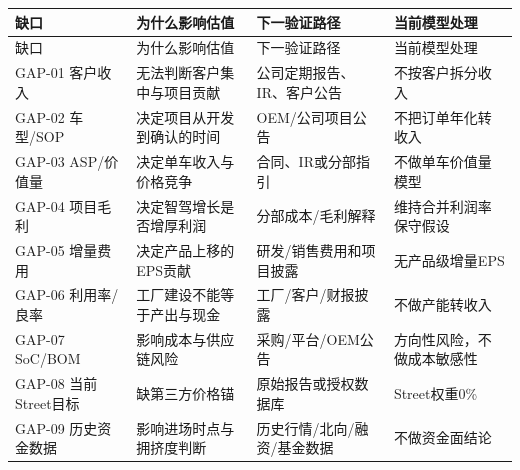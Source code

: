 \begin{longtable}{L{1.2cm}L{2.4cm}L{3.6cm}L{4.7cm}}
\toprule
缺口 & 为什么影响估值 & 下一验证路径 & 当前模型处理 \\
\midrule
\endfirsthead
\toprule
缺口 & 为什么影响估值 & 下一验证路径 & 当前模型处理 \\
\midrule
\endhead
GAP-01 客户收入 & 无法判断客户集中与项目贡献 & 公司定期报告、IR、客户公告 & 不按客户拆分收入 \\
GAP-02 车型/SOP & 决定项目从开发到确认的时间 & OEM/公司项目公告 & 不把订单年化转收入 \\
GAP-03 ASP/价值量 & 决定单车收入与价格竞争 & 合同、IR或分部指引 & 不做单车价值量模型 \\
GAP-04 项目毛利 & 决定智驾增长是否增厚利润 & 分部成本/毛利解释 & 维持合并利润率保守假设 \\
GAP-05 增量费用 & 决定产品上移的EPS贡献 & 研发/销售费用和项目披露 & 无产品级增量EPS \\
GAP-06 利用率/良率 & 工厂建设不能等于产出与现金 & 工厂/客户/财报披露 & 不做产能转收入 \\
GAP-07 SoC/BOM & 影响成本与供应链风险 & 采购/平台/OEM公告 & 方向性风险，不做成本敏感性 \\
GAP-08 当前Street目标 & 缺第三方价格锚 & 原始报告或授权数据库 & Street权重0\% \\
GAP-09 历史资金数据 & 影响进场时点与拥挤度判断 & 历史行情/北向/融资/基金数据 & 不做资金面结论 \\
\bottomrule
\end{longtable}
